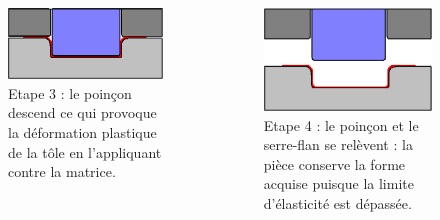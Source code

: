 \documentclass{beamer}
\begin{document}
\begin{frame}
    \begin{columns}
        \begin{figure}
            \includegraphics[width=\textwidth]{img/Emboutissage3.jpg}
            \caption{Etape 3 : le poinçon descend ce qui provoque la déformation plastique de la tôle en l'appliquant contre la matrice.}
        \end{figure}
        \begin{figure}
            \includegraphics[width=\textwidth]{img/Emboutissage4.jpg}
            \caption{Etape 4 : le poinçon et le serre-flan se relèvent : la pièce conserve la forme acquise puisque la limite d'élasticité est dépassée.}
        \end{figure}
    \end{columns}
\end{frame}
\end{document}
